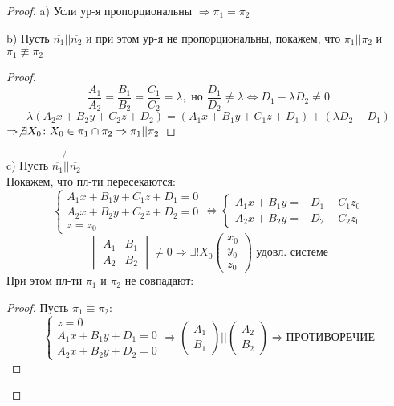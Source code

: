 \begin{proof}
\item [a) ] Усли ур-я пропорциональны $\Rightarrow \pi_1 = \pi_2$ 
\item [b) ] Пусть $\overline{n_1} || \overline{n_2}$ и при этом ур-я не пропорциональны, покажем, что $\pi_1 || \pi_2$ и $\pi_1 \not\equiv \pi_2$
  \begin{proof}
  \[
  \frac{A_1}{A_2} = \frac{B_1}{B_2} = \frac{C_1}{C_2} = \lambda, \text{ но } \frac{D_1}{D_2} \neq \lambda \iff D_1 - \lambda D_2 \neq 0
  \]
  \[
  \lambda(A_2x + B_2y + C_2z + D_2) = (A_1x + B_1y + C_1z + D_1) + (\lambda D_2 - D_1)
  \]
  $\Rightarrow \not\exists X_0 \colon X_0 \in \pi_1 \cap \pi_2 \Rightarrow \pi_1 || \pi_2$
  \end{proof}
\item [c) ] Пусть $\overline{n_1} \not{||} \overline{n_2}$ \\

  Покажем, что пл-ти пересекаются:
  \begin{equation*}
    \begin{cases}
  A_1x + B_1y + C_1z + D_1 = 0 \\
  A_2x + B_2y + C_2z + D_2 = 0 \\
  z = z_0
    \end{cases} \iff
    \begin{cases}
    A_1x + B_1y = -D_1 - C_1z_0 \\
    A_2x + B_2y = -D_2 - C_2z_0
    \end{cases}
  \end{equation*}
  \[
   \begin{vmatrix} A_1 & B_1 \\ A_2 & B_2 \end{vmatrix} \neq 0 \Rightarrow \exists! X_0 \begin{pmatrix}x_0 \\ y_0 \\ z_0 \end{pmatrix} \text{ удовл. системе}
  \]
  При этом пл-ти $\pi_1$ и $\pi_2$ не совпадают:
  \begin{proof}
    Пусть $\pi_1 \equiv \pi_2$:
    \begin{equation*}
    \begin{cases}
    z = 0 \\
    A_1x + B_1y + D_1 = 0 \\
    A_2x + B_2y + D_2 = 0
    \end{cases} \Rightarrow \begin{pmatrix} A_1 \\ B_1 \end{pmatrix} || \begin{pmatrix} A_2 \\ B_2 \end{pmatrix} \Rightarrow \text{ПРОТИВОРЕЧИЕ}
    \end{equation*}
  \end{proof}
\end{proof}
